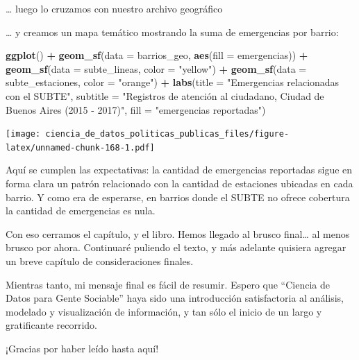 \documentclass[]{book}
\newenvironment{Shaded}{\begin{snugshade}}{\end{snugshade}}
\newcommand{\KeywordTok}[1]{\textcolor[rgb]{0.13,0.29,0.53}{\textbf{#1}}}
\newcommand{\DataTypeTok}[1]{\textcolor[rgb]{0.13,0.29,0.53}{#1}}
\newcommand{\StringTok}[1]{\textcolor[rgb]{0.31,0.60,0.02}{#1}}
\newcommand{\OperatorTok}[1]{\textcolor[rgb]{0.81,0.36,0.00}{\textbf{#1}}}
\newcommand{\NormalTok}[1]{#1}
\begin{document}
\ldots{} luego lo cruzamos con nuestro archivo geográfico

\begin{Shaded}
\end{Shaded}

\ldots{} y creamos un mapa temático mostrando la suma de emergencias por
barrio:

\begin{Shaded}
\begin{Highlighting}[]
\KeywordTok{ggplot}\NormalTok{() }\OperatorTok{+}
\StringTok{    }\KeywordTok{geom_sf}\NormalTok{(}\DataTypeTok{data =}\NormalTok{ barrios_geo, }\KeywordTok{aes}\NormalTok{(}\DataTypeTok{fill =}\NormalTok{ emergencias)) }\OperatorTok{+}
\StringTok{    }\KeywordTok{geom_sf}\NormalTok{(}\DataTypeTok{data =}\NormalTok{ subte_lineas, }\DataTypeTok{color =} \StringTok{"yellow"}\NormalTok{) }\OperatorTok{+}
\StringTok{    }\KeywordTok{geom_sf}\NormalTok{(}\DataTypeTok{data =}\NormalTok{ subte_estaciones, }\DataTypeTok{color =} \StringTok{"orange"}\NormalTok{) }\OperatorTok{+}
\StringTok{    }\KeywordTok{labs}\NormalTok{(}\DataTypeTok{title =} \StringTok{"Emergencias relacionadas con el SUBTE"}\NormalTok{,}
         \DataTypeTok{subtitle =} \StringTok{"Registros de atención al ciudadano, Ciudad de Buenos Aires (2015 - 2017)"}\NormalTok{,}
         \DataTypeTok{fill =} \StringTok{"emergencias reportadas"}\NormalTok{)}
\end{Highlighting}
\end{Shaded}

\texttt{[image: ciencia\_de\_datos\_politicas\_publicas\_files/figure-latex/unnamed-chunk-168-1.pdf]}

Aquí se cumplen las expectativas: la cantidad de emergencias reportadas
sigue en forma clara un patrón relacionado con la cantidad de estaciones
ubicadas en cada barrio. Y como era de esperarse, en barrios donde el
SUBTE no ofrece cobertura la cantidad de emergencias es nula.

Con eso cerramos el capítulo, y el libro. Hemos llegado al brusco
final\ldots{} al menos brusco por ahora. Continuaré puliendo el texto, y
más adelante quisiera agregar un breve capítulo de consideraciones
finales.

Mientras tanto, mi mensaje final es fácil de resumir. Espero que
``Ciencia de Datos para Gente Sociable'' haya sido una introducción
satisfactoria al análisis, modelado y visualización de información, y
tan sólo el inicio de un largo y gratificante recorrido.

¡Gracias por haber leído hasta aquí!


\end{document}

